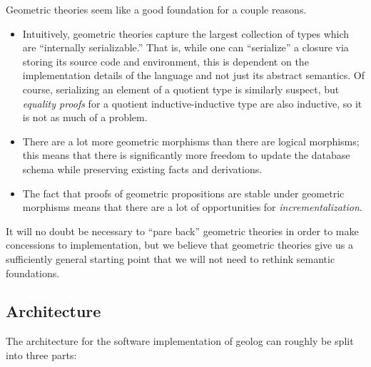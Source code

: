 \documentclass{article}
\begin{document}
Geometric theories seem like a good foundation for a couple reasons.
\begin{itemize}
  \item Intuitively, geometric theories capture the largest collection of types which are ``internally serializable.'' That is, while one can ``serialize'' a closure via storing its source code and environment, this is dependent on the implementation details of the language and not just its abstract semantics. Of course, serializing an element of a quotient type is similarly suspect, but \emph{equality proofs} for a quotient inductive-inductive type are also inductive, so it is not as much of a problem.
  \item There are a lot more geometric morphisms than there are logical morphisms; this means that there is significantly more freedom to update the database schema while preserving existing facts and derivations.
  \item The fact that proofs of geometric propositions are stable under geometric morphisms means that there are a lot of opportunities for \emph{incrementalization}.
\end{itemize}

It will no doubt be necessary to ``pare back'' geometric theories in order to make concessions to implementation, but we believe that geometric theories give us a sufficiently general starting point that we will not need to rethink semantic foundations.

\subsection{Architecture}
The architecture for the software implementation of geolog can roughly be split into three parts:
\end{document}
